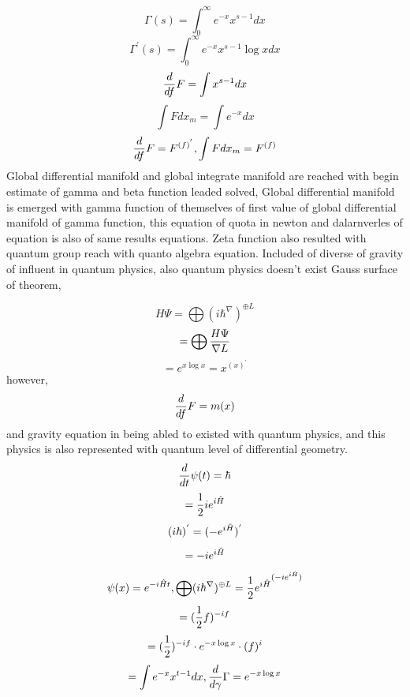 \documentclass{jsarticle}
\begin{document}
{    $$ \Gamma(s) = \int^{\infty}_{0} e^{-x}x^{s - 1}dx $$
    $$  \Gamma^{'}(s) = \int^{\infty}_{0} e^{-x}x^{s - 1} \log x dx $$
    $$ {d \over df}F = \int x^{s - 1}dx $$
    $$ \int F dx_m = \int e^{-x}dx $$
    $$ {d \over df}F = F^{(f)^{'}}, \int F dx_m = F^{(f)} $$
    Global differential manifold and global integrate manifold are
    reached with begin estimate of gamma and beta function leaded solved,
    Global differential manifold is emerged with gamma function of
    themselves of first value of global differential manifold of gamma
    function, this equation of quota in newton and dalarnverles of equation
    is also of same results equations. Zeta function also resulted with
    quantum group reach with quanto algebra equation.
        Included of diverse of gravity of influent in quantum physics,
    also quantum physics doesn't exist Gauss surface of theorem,
   
    $$ H \Psi = \bigoplus (i \hbar ^{\nabla})^{\oplus L} $$
    $$ = \bigoplus {{ H \Psi} \over \nabla L} $$
    $$ = e^{x \log x} = x^{(x)^{'}} $$
    however,
    $$ {d \over df}F = m(x) $$
    and gravity equation in being abled to existed with quantum physics,
    and this physics is also represented with quantum level of differential
    geometry.
    $$ {d \over dt}\psi(t) = \hbar $$
    $$ = {1 \over 2}i e^{i \Hat{H}} $$
    $$ (i \hbar)^{'} = (- e^{i \Hat{H}})^{'} $$
    $$ = - i e^{i \Hat{H}} $$
    $$ \psi(x) = e^{-i \Hat{H}t}, \bigoplus (i \hbar ^{\nabla})^{\oplus L} 
    = {{{1 \over 2} e^{i \Hat{H}}}^{(-i e^{i \Hat{H}})}} $$
    $$ = ({1 \over 2}f)^{-i f}$$
    $$ = ({1 \over 2})^{-i f} \cdot e^{-x \log x} \cdot (f)^{i} $$
    $$ = \int e^{- x} x^{t - 1}dx, {d \over d \gamma}\Gamma = e^{-x \log x}  $$
     
}
\end{document}
